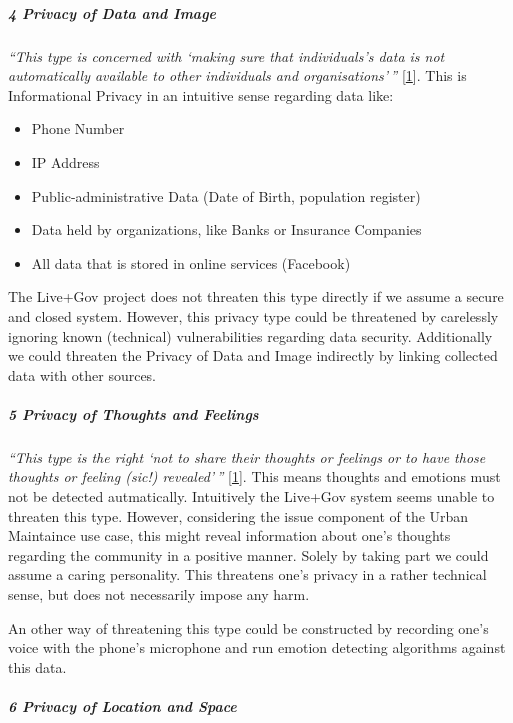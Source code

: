 \subparagraph{4 Privacy of Data and Image}

\emph{``This type is concerned with `making sure that individuals's data
is not automatically available to other individuals and
organisations'\,''} {[}\hyperref[references]{1}{]}. This is
Informational Privacy in an intuitive sense regarding data like:

\begin{itemize}

\item
  Phone Number
\item
  IP Address
\item
  Public-administrative Data (Date of Birth, population register)
\item
  Data held by organizations, like Banks or Insurance Companies
\item
  All data that is stored in online services (Facebook)
\end{itemize}

The Live+Gov project does not threaten this type directly if we assume a
secure and closed system. However, this privacy type could be threatened
by carelessly ignoring known (technical) vulnerabilities regarding data
security. Additionally we could threaten the Privacy of Data and Image
indirectly by linking collected data with other sources.

\subparagraph{5 Privacy of Thoughts and Feelings}

\emph{``This type is the right `not to share their thoughts or feelings
or to have those thoughts or feeling (sic!) revealed'\,''}
{[}\hyperref[references]{1}{]}. This means thoughts and emotions must
not be detected autmatically. Intuitively the Live+Gov system seems
unable to threaten this type. However, considering the issue component
of the Urban Maintaince use case, this might reveal information about
one's thoughts regarding the community in a positive manner. Solely by
taking part we could assume a caring personality. This threatens one's
privacy in a rather technical sense, but does not necessarily impose any
harm.

An other way of threatening this type could be constructed by recording
one's voice with the phone's microphone and run emotion detecting
algorithms against this data.

\subparagraph{6 Privacy of Location and Space}

